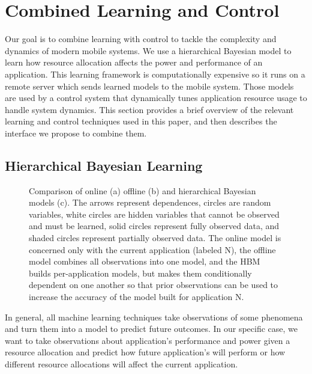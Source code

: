 \section{Combined Learning and Control}

Our goal is to combine learning with control to tackle the complexity
and dynamics of modern mobile systems.  We use a hierarchical Bayesian
model to learn how resource allocation affects the power and
performance of an application.  This learning framework is
computationally expensive so it runs on a remote server which sends
learned models to the mobile system.  Those models are used by a
control system that dynamically tunes application resource usage to
handle system dynamics. This section provides a brief overview of the
relevant learning and control techniques used in this paper, and then
describes the interface we propose to combine them.

\subsection{Hierarchical Bayesian Learning}

\begin{figure*}

  \caption{ Comparison of online (a) offline (b) and hierarchical
    Bayesian models (c).  The arrows represent dependences, circles
    are random variables, white circles are hidden variables that
    cannot be observed and must be learned, solid circles represent
    fully observed data, and shaded circles represent partially
    observed data.  The online model is concerned only with the
    current application (labeled N), the offline model combines all
    observations into one model, and the HBM builds per-application
    models, but makes them conditionally dependent on one another so
    that prior observations can be used to increase the accuracy of
    the model built for application N.}
\label{fig:learning-models}
\end{figure*}

In general, all machine learning techniques take observations of some
phenomena and turn them into a model to predict future outcomes.  In
our specific case, we want to take observations about application's
performance and power given a resource allocation and predict how
future application's will perform or how different resource
allocations will affect the current application.  

